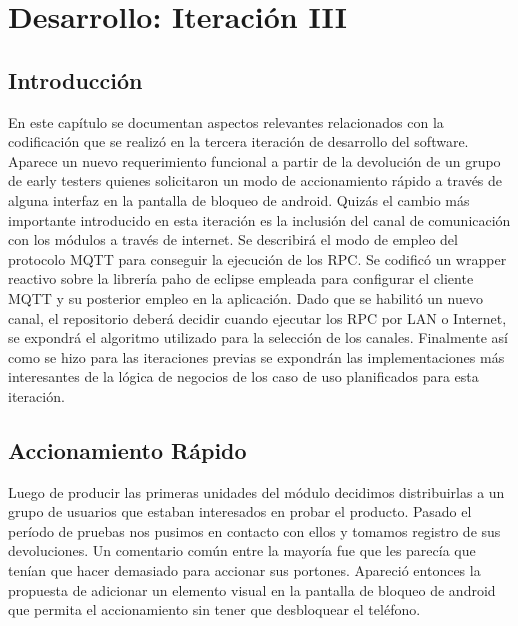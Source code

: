 \chapter{Desarrollo: Iteración III} %

\label{Chapter8} %


\section{Introducción}
En este capítulo se documentan aspectos relevantes relacionados con la codificación que se realizó en la tercera iteración de desarrollo del software.\\
Aparece un nuevo requerimiento funcional a partir de la devolución de un grupo de early testers quienes solicitaron un modo de accionamiento rápido a través de alguna interfaz en la pantalla de bloqueo de android.
Quizás el cambio más importante introducido en esta iteración es la inclusión del canal de comunicación con los módulos a través de internet. Se describirá el modo de empleo del protocolo MQTT para conseguir la ejecución de los RPC. Se codificó un wrapper reactivo sobre la librería paho de eclipse empleada para configurar el cliente MQTT y su posterior empleo en la aplicación. %
Dado que se habilitó un nuevo canal, el repositorio deberá decidir cuando ejecutar los RPC por LAN o Internet, se expondrá el algoritmo utilizado para la selección de los canales.
Finalmente así como se hizo para las iteraciones previas se expondrán las implementaciones más interesantes de la lógica de negocios de los caso de uso planificados para esta iteración.
\section{Accionamiento Rápido}
Luego de producir las primeras unidades del módulo
decidimos distribuirlas a un grupo de usuarios que estaban interesados en probar el producto.
Pasado el período de pruebas nos pusimos en contacto con ellos y tomamos registro de sus devoluciones.
Un comentario común entre la mayoría fue que les parecía que tenían que hacer demasiado para accionar sus portones.
Apareció entonces la propuesta de adicionar un elemento visual en la pantalla de bloqueo de android
que permita el accionamiento sin tener que desbloquear el teléfono.

